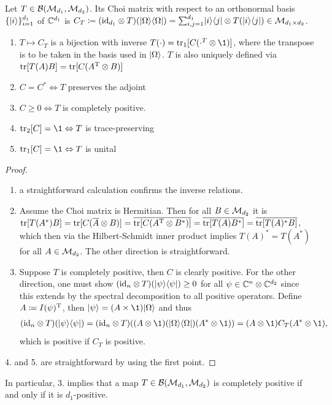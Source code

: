 \begin{theorem}
    Let $T \in \mathcal B(\mathcal M_{d_1}, \mathcal M_{d_2})$. Its Choi matrix with respect to an orthonormal basis $\{\lvert i\rangle\}_{i=1}^{d_1}$ of $\mathbb{C}^{d_1}$ is $C_T\coloneqq (\mathrm{id}_{d_1} \otimes T)(\lvert\Omega\rangle\langle\Omega\rvert)=\sum_{i,j=1}^{d_1} \lvert i\rangle\langle j\rvert\otimes T(\lvert i\rangle\langle j\rvert) \in \mathcal M_{d_1 \times d_2}$.
    \begin{enumerate}
        \item$T\mapsto C_T$ is a bijection with inverse $T(\cdot) = \tr_1[C(\cdot^T \otimes \1)]$, where the transpose is to be taken in the basis used in $\lvert\Omega\rangle$. $T$ is also uniquely defined via $\mathrm{tr}[T(A)B]=\mathrm{tr}[C(A^\text T \otimes B)]$
        \item$C = C^* \Leftrightarrow T$ preserves the adjoint
        \item$C \geq 0 \Leftrightarrow T$ is completely positive.
        \item$\tr_2[C] = \1 \Leftrightarrow T$ is trace-preserving
        \item$\tr_1[C] = \1 \Leftrightarrow T$ is unital
    \end{enumerate}
\end{theorem}
\begin{proof}
    \begin{enumerate}
        \item a straightforward calculation confirms the inverse relations.
        \item Assume the Choi matrix is Hermitian. Then for all $B \in \mathcal M_{d_2}$ it is $\mathrm{tr}[T(A^*)B] = \mathrm{tr}[C(\overline A\otimes B)] = \overline{\mathrm{tr}[C(A^\text T \otimes B^*)]}=\overline{\mathrm{tr}[T(A)B^*]}=\overline{\mathrm{tr}[T(A)^*B]}$, which then via the Hilbert-Schmidt inner product implies $T(A)^*=T(A^*)$ for all $A \in \mathcal M_{d_2}$. The other direction is straightforward.
    \item Suppose $T$ is completely positive, then $C$ is clearly positive. For the other direction, one must show $(\mathrm{id}_n \otimes T)(\lvert\psi\rangle\langle\psi\rvert)\geq 0$ for all $\psi \in \mathbb{C}^n \otimes \mathbb{C}^{d_2}$ since this extends by the spectral decomposition to all positive operators. Define $A\coloneqq I(\psi)^\text T$, then $\ket \psi = (A \times \1)\ket \Omega$ and thus
    \begin{align*}
        (\id_n \otimes T)(\pr \psi) = (\id_n \otimes T)((A \otimes \1)(\pr \Omega) (A^* \otimes \1)) = (A\otimes \1)C_T(A^*\otimes \1),
    \end{align*}
    which is positive if $C_T$ is positive.
    \end{enumerate}
    4. and 5. are straightforward by using the first point.
\end{proof}
In particular, 3. implies that a map $T \in \mathcal B(\mathcal M_{d_1}, \mathcal M_{d_2})$ is completely positive if and only if it is $d_1$-positive.

